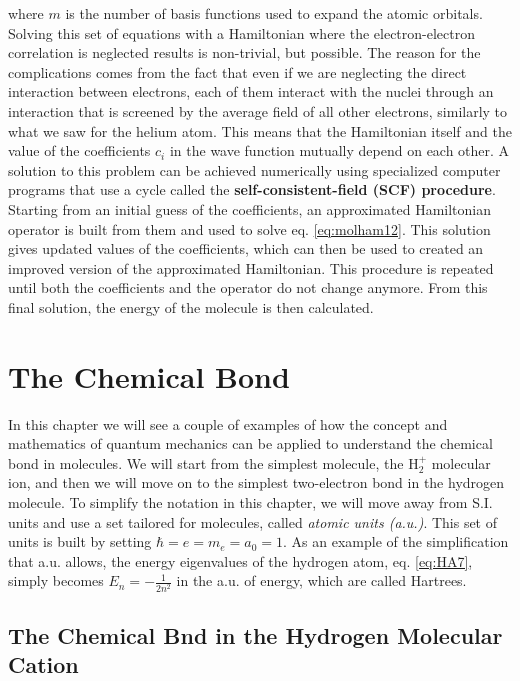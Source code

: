 \documentclass[
  9pt,
]{extbook}
\theoremstyle{definition}
\theoremstyle{definition}
\theoremstyle{definition}
\theoremstyle{remark}
\begin{document}
where \(m\) is the number of basis functions used to expand the atomic orbitals. Solving this set of equations with a Hamiltonian where the electron-electron correlation is neglected results is non-trivial, but possible. The reason for the complications comes from the fact that even if we are neglecting the direct interaction between electrons, each of them interact with the nuclei through an interaction that is screened by the average field of all other electrons, similarly to what we saw for the helium atom. This means that the Hamiltonian itself and the value of the coefficients \(c_i\) in the wave function mutually depend on each other. A solution to this problem can be achieved numerically using specialized computer programs that use a cycle called the \textbf{self-consistent-field (SCF) procedure}. Starting from an initial guess of the coefficients, an approximated Hamiltonian operator is built from them and used to solve eq. \eqref{eq:molham12}. This solution gives updated values of the coefficients, which can then be used to created an improved version of the approximated Hamiltonian. This procedure is repeated until both the coefficients and the operator do not change anymore. From this final solution, the energy of the molecule is then calculated.

\hypertarget{Bonds}{%
\chapter{The Chemical Bond}\label{Bonds}}

In this chapter we will see a couple of examples of how the concept and mathematics of quantum mechanics can be applied to understand the chemical bond in molecules. We will start from the simplest molecule, the \(\mathrm{H}_2^+\) molecular ion, and then we will move on to the simplest two-electron bond in the hydrogen molecule. To simplify the notation in this chapter, we will move away from S.I. units and use a set tailored for molecules, called \emph{atomic units (a.u.)}. This set of units is built by setting \(\hbar=e=m_e=a_0=1\). As an example of the simplification that a.u. allows, the energy eigenvalues of the hydrogen atom, eq. \eqref{eq:HA7}, simply becomes \(E_n=-\frac{1}{2n^2}\) in the a.u. of energy, which are called Hartrees.

\hypertarget{the-chemical-bnd-in-the-hydrogen-molecular-cation}{%
\section{The Chemical Bnd in the Hydrogen Molecular Cation}\label{the-chemical-bnd-in-the-hydrogen-molecular-cation}}
\end{document}
